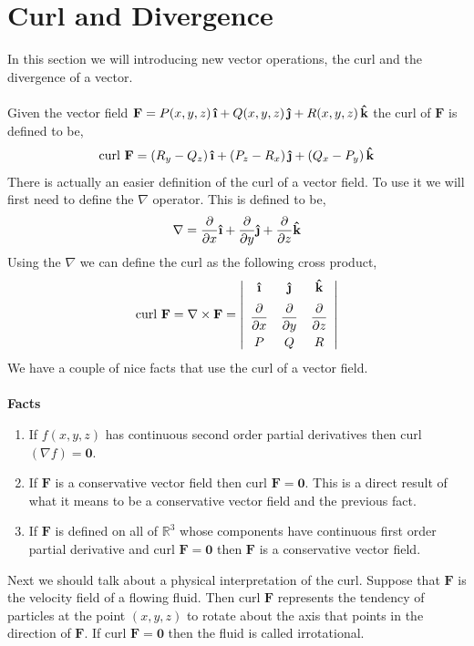 \documentclass[10pt,reqno]{book}
\theoremstyle{definition}
\renewcommand{\vec}[1]{\mathbf{#1}}
\newcommand{\uvec}[1]{\boldsymbol{\hat{\textbf{#1}}}}
\def\R{\mathbb{R}}
\begin{document}
	\section{Curl and Divergence}
	
	In this section we will introducing new vector operations, the curl and the divergence of a vector.\\ \\
	Given the vector field $ \vec{F} = P(x,y,z)\, \uvec{\i} + Q(x,y,z)\,\uvec{\j} + R(x,y,z)\,\uvec{k} $ the curl of $ \vec{F} $ is defined to be,
	\[ \text{curl }  \vec{F} = (R_y - Q_z)\, \uvec{\i} + (P_z - R_x)\,\uvec{\j} + (Q_x - P_y)\, \uvec{k} \]
	There is actually an easier definition of the curl of a vector field. To use it we will first need to define the $ \nabla $ operator. This is defined to be,
	\[ \nabla = \frac{\partial}{\partial x} \uvec{\i} + \frac{\partial}{\partial y} \uvec{\j} + \frac{\partial}{\partial z} \uvec{k} \]
	Using the $ \nabla $ we can define the curl as the following cross product,
	\[ 
		\text{curl } \vec{F} = \nabla \times \vec{F} = 
			\left|
				\begin{array}{ccc}
					\uvec{\i} & \uvec{\j} & \uvec{k}\\[6pt]
					\dfrac{\partial}{\partial x} & \dfrac{\partial}{\partial y} & \dfrac{\partial}{\partial z}\\[8pt]
					P & Q & R
				\end{array}
			\right| 
	\]
	We have a couple of nice facts that use the curl of a vector field.\\ \\
	\textbf{Facts}
	\begin{enumerate}
		\item If $ f(x,y,z) $ has continuous second order partial derivatives then curl$ (\nabla f) = \vec{0} $.
		\item  If $ \vec{F} $ is a conservative vector field then curl $ \vec{F} = \vec{0} $. This is a direct result of what it means to be a conservative vector field and the previous fact.
		\item If $ \vec{F} $ is defined on all of $ \R^3 $ whose components have continuous first order partial derivative and curl $ \vec{F} = \vec{0} $ then $ \vec{F} $ is a conservative vector field.
	\end{enumerate}
	Next we should talk about a physical interpretation of the curl. Suppose that $ \vec{F} $ is the velocity field of a flowing fluid. Then curl $ \vec{F} $ represents the tendency of particles at the point $ (x,y,z) $ to rotate about the axis that points in the direction of $ \vec{F} $. If curl $ \vec{F} = \vec{0} $ then the fluid is called irrotational.\\ \\
\end{document}

